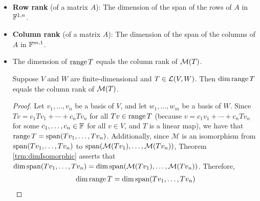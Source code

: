 \documentclass[../main.tex]{subfiles}
\begin{document}
\begin{itemize}
\begin{theorem}
\begin{proof}
\begin{equation*}
                T'(\psi_j) = \sum_{r=1}^nC_{r,j}\varphi_r
            \end{equation*}
            from the definition of $T'$ that
            \begin{align*}
                (\psi\circ T)(v_k) &= \sum_{r=1}^nC_{r,j}\varphi_r(v_k)\\
                &= C_{k,j}
            \end{align*}
            and from the definition of $\mat{T}$ that
            \begin{align*}
                (\psi\circ T)(v_k) &= \psi_j(Tv_k)\\
                &= \psi_j\left( \sum_{r=1}^mA_{r,k}w_r \right)\\
                &= \sum_{r=1}^mA_{r,k}\psi_j(w_r)\\
                &= A_{j,k}
            \end{align*}
            Therefore, from the last two results, we have by transitivity that $A_{j,k}=C_{k,j}$ for all $1\leq j\leq m$ and $1\leq k\leq n$. It follows that $C=A^t$, i.e., that $\mat{T'}=(\mat{T})^t$, as desired.
        \end{proof}
    \end{theorem}
    \item \textbf{Row rank} (of a matrix $A$): The dimension of the span of the rows of $A$ in $\mathbb{F}^{1,n}$.
    \item \textbf{Column rank} (of a matrix $A$): The dimension of the span of the columns of $A$ in $\mathbb{F}^{m,1}$.
    \item The dimension of $\operatorname{range} T$ equals the column rank of $\mat{T}$.
    \begin{theorem}\label{trm:columnRankRange}
        Suppose $V$ and $W$ are finite-dimensional and $T\in\mathcal{L}(V,W)$. Then $\dim\operatorname{range} T$ equals the column rank of $\mat{T}$.
        \begin{proof}
            Let $v_1,\dots,v_n$ be a basis of $V$, and let $w_1,\dots,w_m$ be a basis of $W$. Since $Tv=c_1Tv_1+\cdots+c_nTv_n$ for all $Tv\in\operatorname{range} T$ (because $v=c_1v_1+\cdots+c_nTv_n$ for some $c_1,\dots,c_n\in\mathbb{F}$ for all $v\in V$, and $T$ is a linear map), we have that $\operatorname{range} T=\operatorname{span}(Tv_1,\dots,Tv_n)$. Additionally, since $\mathcal{M}$ is an isomorphism from $\operatorname{span}(Tv_1,\dots,Tv_n)$ to $\operatorname{span}(\mathcal{M}(Tv_1),\dots,\mathcal{M}(Tv_n))$, Theorem \ref{trm:dimIsomorphic} asserts that $\dim\operatorname{span}(Tv_1,\dots,Tv_n)=\dim\operatorname{span}(\mathcal{M}(Tv_1),\dots,\mathcal{M}(Tv_n))$. Therefore,
            \begin{align*}
                \dim\range T &= \dim\spn(Tv_1,\dots,Tv_n)\\

\end{align*}
\end{proof}
\end{theorem}
\end{itemize}
\end{document}

